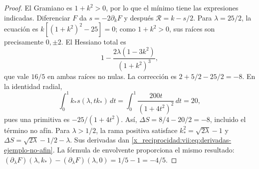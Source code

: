 \begin{proof}
El Gramiano es \(1+k^2>0\), por lo que el mínimo tiene las
expresiones indicadas. Diferenciar \(F\) da
\(s=-2\partial_kF\) y después \(\mathcal R=k-s/2\).
Para \(\lambda=25/2\), la ecuación es
\(k[(1+k^2)^2-25]=0\); como \(1+k^2>0\), sus raíces
son precisamente \(0,\pm2\). El Hessiano total es
\[
 1-\frac{2\lambda(1-3k^2)}{(1+k^2)^3},
\]
que vale \(16/5\) en ambas raíces no nulas. La corrección es
\(2+5/2-25/2=-8\). En la identidad radial,
\[
 \int_0^1 k_*s(\lambda,tk_*)\,dt
    =\int_0^1\frac{200t}{(1+4t^2)^2}\,dt=20,
\]
pues una primitiva es \(-25/(1+4t^2)\).
Así, \(\Delta S=8/4-20/2=-8\), incluido el término no afín.
Para \(\lambda>1/2\), la rama positiva satisface
\(k_*^2=\sqrt{2\lambda}-1\) y
\(\Delta S=\sqrt{2\lambda}-1/2-\lambda\).
Sus derivadas dan \eqref{x_reciprocidad:vii:eq:derivadas-ejemplo-no-afin}.
La fórmula de envolvente proporciona el mismo resultado:
\((\partial_\lambda F)(\lambda,k_*)
 -(\partial_\lambda F)(\lambda,0)=1/5-1=-4/5\).
\end{proof}




